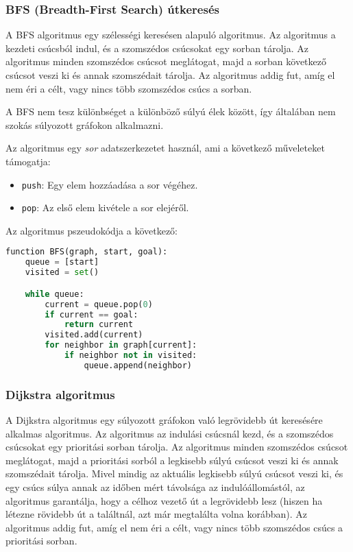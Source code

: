 \subsubsection{BFS (Breadth-First Search) útkeresés}

A BFS algoritmus egy szélességi keresésen alapuló algoritmus. Az algoritmus a kezdeti csúcsból indul, és a szomszédos csúcsokat egy sorban tárolja. Az algoritmus minden szomszédos csúcsot meglátogat, majd a sorban következő csúcsot veszi ki és annak szomszédait tárolja. Az algoritmus addig fut, amíg el nem éri a célt, vagy nincs több szomszédos csúcs a sorban.

A BFS nem tesz különbséget a különböző súlyú élek között, így általában nem szokás súlyozott gráfokon alkalmazni\cite{russell2020artificial}.

Az algoritmus egy \textit{sor} adatszerkezetet használ\cite{russell2020artificial}, ami a következő műveleteket támogatja:

\begin{itemize}
    \item \texttt{push}: Egy elem hozzáadása a sor végéhez.
    \item \texttt{pop}: Az első elem kivétele a sor elejéről.
\end{itemize}

Az algoritmus pszeudokódja a következő:

\begin{lstlisting}[language={Python}]
function BFS(graph, start, goal):
    queue = [start]
    visited = set()

    while queue:
        current = queue.pop(0)
        if current == goal:
            return current
        visited.add(current)
        for neighbor in graph[current]:
            if neighbor not in visited:
                queue.append(neighbor)
\end{lstlisting}

\subsubsection{Dijkstra algoritmus}

A Dijkstra algoritmus egy súlyozott gráfokon való legrövidebb út\cite{russell2020artificial} keresésére alkalmas algoritmus. Az algoritmus az indulási csúcsnál kezd, és a szomszédos csúcsokat egy prioritási sorban tárolja. Az algoritmus minden szomszédos csúcsot meglátogat, majd a prioritási sorból a legkisebb súlyú csúcsot veszi ki és annak szomszédait tárolja. Mivel mindig az aktuális legkisebb súlyú csúcsot veszi ki, és egy csúcs súlya annak az időben mért távolsága az indulóállomástól, az algoritmus garantálja, hogy a célhoz vezető út a legrövidebb lesz (hiszen ha létezne rövidebb út a találtnál, azt már megtalálta volna korábban). Az algoritmus addig fut, amíg el nem éri a célt, vagy nincs több szomszédos csúcs a prioritási sorban.

